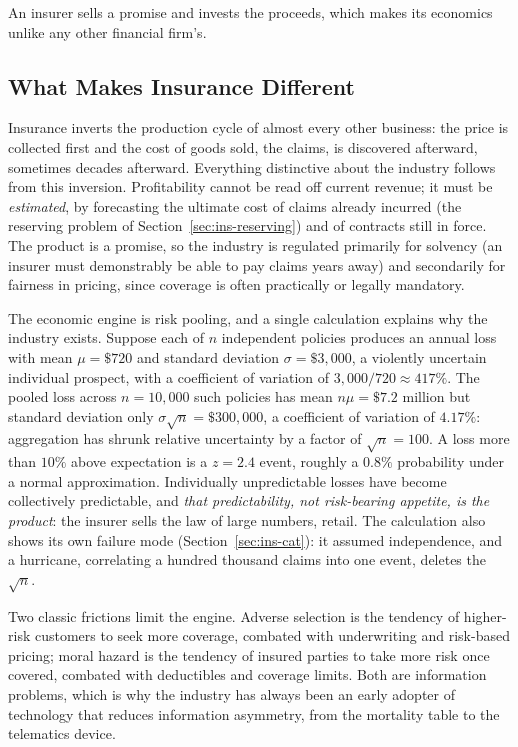 \documentclass[../ai_in_finance]{subfiles}
\begin{document}
An insurer sells a promise and invests the proceeds, which makes its economics unlike any other financial firm's.

\subsection{What Makes Insurance Different}
\label{sec:ins-fundamentals}

Insurance inverts the production cycle of almost every other business: the price is collected first and the cost of goods sold, the claims, is discovered afterward, sometimes decades afterward. Everything distinctive about the industry follows from this inversion. Profitability cannot be read off current revenue; it must be \emph{estimated}, by forecasting the ultimate cost of claims already incurred (the reserving problem of Section~\ref{sec:ins-reserving}) and of contracts still in force. The product is a promise, so the industry is regulated primarily for solvency (an insurer must demonstrably be able to pay claims years away) and secondarily for fairness in pricing, since coverage is often practically or legally mandatory.

The economic engine is risk pooling, and a single calculation explains why the industry exists. Suppose each of $n$ independent policies produces an annual loss with mean $\mu = \$720$ and standard deviation $\sigma = \$3{,}000$, a violently uncertain individual prospect, with a coefficient of variation of $3{,}000/720 \approx 417\%$. The pooled loss across $n = 10{,}000$ such policies has mean $n\mu = \$7.2$ million but standard deviation only $\sigma\sqrt{n} = \$300{,}000$, a coefficient of variation of $4.17\%$: aggregation has shrunk relative uncertainty by a factor of $\sqrt{n} = 100$. A loss more than $10\%$ above expectation is a $z = 2.4$ event, roughly a $0.8\%$ probability under a normal approximation. Individually unpredictable losses have become collectively predictable, and \emph{that predictability, not risk-bearing appetite, is the product}: the insurer sells the law of large numbers, retail. The calculation also shows its own failure mode (Section~\ref{sec:ins-cat}): it assumed independence, and a hurricane, correlating a hundred thousand claims into one event, deletes the $\sqrt{n}$.

Two classic frictions limit the engine. Adverse selection is the tendency of higher-risk customers to seek more coverage, combated with underwriting and risk-based pricing; moral hazard is the tendency of insured parties to take more risk once covered, combated with deductibles and coverage limits. Both are information problems, which is why the industry has always been an early adopter of technology that reduces information asymmetry, from the mortality table to the telematics device.
\end{document}
